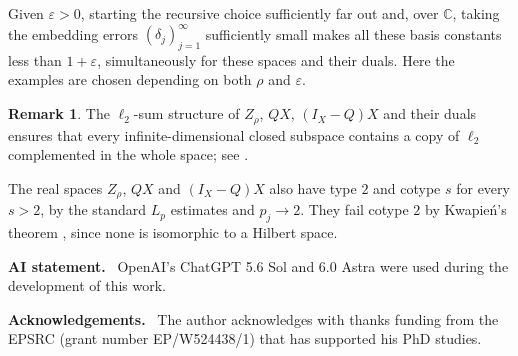 \documentclass[11pt,a4paper,reqno]{amsart}
\theoremstyle{definition}
\newtheorem{remark}[remark]{Remark}
\newenvironment{AIstatement}
  {\par\medskip\noindent\textbf{AI statement.}\ \ignorespaces}
  {\par}
\newenvironment{acknowledgements}
  {\par\medskip\noindent\textbf{Acknowledgements.}\ \ignorespaces}
  {\par}
\newcommand{\C}{\mathbb C}
\numberwithin{equation}{section}
\begin{document}
Given $\varepsilon>0$, starting the recursive choice sufficiently far out and, over $\C$, taking the embedding errors $(\delta_j)_{j=1}^{\infty}$ sufficiently small makes all these basis constants less than $1+\varepsilon$, simultaneously for these spaces and their duals. Here the examples are chosen depending on both $\rho$ and $\varepsilon$.
\begin{remark}\label{rem:geometric-properties}
The $\ell_2$-sum structure of $Z_\rho$, $QX$, $(I_X-Q)X$ and their duals ensures that every infinite-dimensional closed subspace contains a copy of $\ell_2$ complemented in the whole space; see \cite[proof of Proposition~2.1(b) and Proposition~2.4]{OikhbergSpinu2015}.

The real spaces $Z_\rho$, $QX$ and $(I_X-Q)X$ also have type $2$ and cotype $s$ for every $s>2$, by the standard $L_p$ estimates and $p_j\to2$. They fail cotype $2$ by Kwapie\'n's theorem \cite{Kwapien1972}, since none is isomorphic to a Hilbert space.
\end{remark}

\begin{AIstatement}
OpenAI's ChatGPT 5.6 Sol and 6.0 Astra were used during the development of this work.
\end{AIstatement}

\begin{acknowledgements}
The author acknowledges with thanks funding from the EPSRC (grant number EP/W524438/1) that has supported his PhD studies.
\end{acknowledgements}
\end{document}
